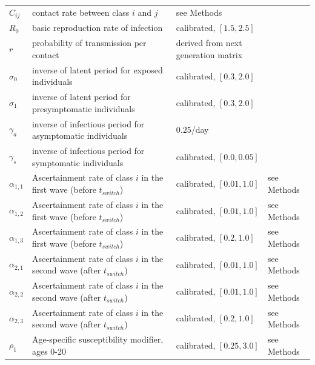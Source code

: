 \begin{table}[H]
\begin{tabular}{llll}
  $C_{ij}$    & contact rate between class $i$ and $j$    & see Methods & \cite{prem2020projecting} \\
  $R_0$ & basic reproduction rate of infection & calibrated, $[1.5,2.5]$ & \cite{hilton2020estimation,googlemobility, ontariocoviddata}  \\
  $r$         & probability of transmission per contact   & derived from next generation matrix & \cite{diekmann2010construction} \\
  $\sigma_0$    & inverse of latent period for exposed individuals                  & calibrated, $[0.3,2.0]$ & \cite{googlemobility, ontariocoviddata,nishiura2020serial,lauer2020incubation,tindale2020transmission} \\
  $\sigma_1$    & inverse of latent period for presymptomatic individuals & calibrated, $[0.3,2.0]$ & \cite{googlemobility, ontariocoviddata,nishiura2020serial,lauer2020incubation,tindale2020transmission} \\
  $\gamma_a$    & inverse of infectious period for asymptomatic individuals & $0.25$/day &  \cite{nishiura2020serial,lauer2020incubation,tindale2020transmission} \\
  $\gamma_s$    & inverse of infectious period for symptomatic individuals  & calibrated, $[0.0,0.05]$ & \cite{googlemobility, ontariocoviddata,nishiura2020serial,lauer2020incubation,tindale2020transmission} \\
  $\alpha_{1,1}$ & Ascertainment rate of class $i$ in the first wave (before $t_{switch}$) & calibrated, $[0.01,1.0]$ & see Methods\\
  $\alpha_{1,2}$ & Ascertainment rate of class $i$  in the first wave (before $t_{switch}$) & calibrated, $[0.01,1.0]$ & see Methods\\
  $\alpha_{1,3}$ & Ascertainment rate of class $i$ in the first wave (before $t_{switch}$) & calibrated, $[0.2,1.0]$ & see Methods\\
  $\alpha_{2,1}$ & Ascertainment rate of class $i$  in the second wave (after $t_{switch}$)& calibrated, $[0.01,1.0]$ & see Methods\\
  $\alpha_{2,2}$ & Ascertainment rate of class $i$ in the second wave (after $t_{switch}$) & calibrated, $[0.01,1.0]$ & see Methods\\
  $\alpha_{2,3}$ & Ascertainment rate of class $i$  in the second wave (after $t_{switch}$)& calibrated, $[0.2,1.0]$ & see Methods\\
  $\rho_1$ & Age-specific susceptibility modifier, ages 0-20 & calibrated, $[0.25,3.0]$  & see Methods\\

\end{tabular}
\end{table}
